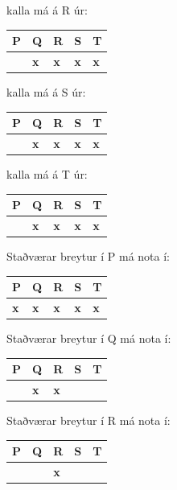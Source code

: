 \documentclass{article}
\newcommand{\bo}[1]{\textbf{#1}}
\begin{document}
     kalla má á R úr:

     
     \begin{tabularx}{\textwidth}{ |X|X|X|X|X|}
        \hline
        \textbf{P}  & \textbf{Q}  & \textbf{R}  & \textbf{S}  & \textbf{T} \\ \hline
         & \bo{x} & \bo{x} & \bo{x} & \bo{x} \\ \hline
     \end{tabularx}

     kalla má á S úr:

     
     \begin{tabularx}{\textwidth}{ |X|X|X|X|X|}
        \hline
        \textbf{P}  & \textbf{Q}  & \textbf{R}  & \textbf{S}  & \textbf{T} \\ \hline
         & \bo{x} & \bo{x} & \bo{x} & \bo{x} \\ \hline
     \end{tabularx}

     kalla má á T úr:

     
     \begin{tabularx}{\textwidth}{ |X|X|X|X|X|}
        \hline
        \textbf{P}  & \textbf{Q}  & \textbf{R}  & \textbf{S}  & \textbf{T} \\ \hline
         & \bo{x} & \bo{x}  & \bo{x}  & \bo{x}  \\ \hline
     \end{tabularx}

     Staðværar breytur í P má nota í:

     
     \begin{tabularx}{\textwidth}{ |X|X|X|X|X|}
        \hline
        \textbf{P}  & \textbf{Q}  & \textbf{R}  & \textbf{S}  & \textbf{T} \\ \hline
        \bo{x} & \bo{x} & \bo{x} & \bo{x} & \bo{x} \\ \hline
     \end{tabularx}


     Staðværar breytur í Q má nota í:

     
     \begin{tabularx}{\textwidth}{ |X|X|X|X|X|}
        \hline
        \textbf{P}  & \textbf{Q}  & \textbf{R}  & \textbf{S}  & \textbf{T} \\ \hline
         & \bo{x} & \bo{x} & & \\ \hline
     \end{tabularx}


     Staðværar breytur í R má nota í:

     
     \begin{tabularx}{\textwidth}{ |X|X|X|X|X|}
        \hline
        \textbf{P}  & \textbf{Q}  & \textbf{R}  & \textbf{S}  & \textbf{T} \\ \hline
         & & \bo{x} & & \\ \hline
     \end{tabularx}
\end{document}
